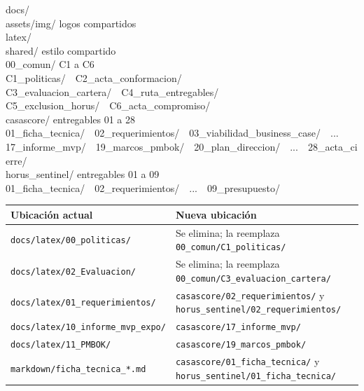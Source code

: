 \documentclass[11pt,a4paper]{article}
\begin{document}
{\small\ttfamily\noindent
docs/\\
\hspace*{1.5em}assets/img/ \hfill \textrm{logos compartidos}\\
\hspace*{1.5em}latex/\\
\hspace*{3em}shared/ \hfill \textrm{estilo compartido}\\
\hspace*{3em}00\_comun/ \hfill \textrm{C1 a C6}\\
\hspace*{4.5em}C1\_politicas/\ \ C2\_acta\_conformacion/\\
\hspace*{4.5em}C3\_evaluacion\_cartera/\ \ C4\_ruta\_entregables/\\
\hspace*{4.5em}C5\_exclusion\_horus/\ \ C6\_acta\_compromiso/\\
\hspace*{3em}casascore/ \hfill \textrm{entregables 01 a 28}\\
\hspace*{4.5em}01\_ficha\_tecnica/\ \ 02\_requerimientos/\ \ 03\_viabilidad\_business\_case/\ \ ...\\
\hspace*{4.5em}17\_informe\_mvp/\ \ 19\_marcos\_pmbok/\ \ 20\_plan\_direccion/\ \ ...\ \ 28\_acta\_cierre/\\
\hspace*{3em}horus\_sentinel/ \hfill \textrm{entregables 01 a 09}\\
\hspace*{4.5em}01\_ficha\_tecnica/\ \ 02\_requerimientos/\ \ ...\ \ 09\_presupuesto/
}
\vspace{0.2cm}


{\small
\noindent\begin{tabularx}{\textwidth}{@{}L L@{}}
\toprule
{}
\textbf{Ubicación actual} & \textbf{Nueva ubicación} \\
\midrule
\texttt{docs/latex/00\_politicas/} & Se elimina; la reemplaza \texttt{00\_comun/C1\_politicas/} \\
\texttt{docs/latex/02\_Evaluacion/} & Se elimina; la reemplaza \texttt{00\_comun/C3\_evaluacion\_cartera/} \\
\texttt{docs/latex/01\_requerimientos/} & \texttt{casascore/02\_requerimientos/} y \texttt{horus\_sentinel/02\_requerimientos/} \\
\texttt{docs/latex/10\_informe\_mvp\_expo/} & \texttt{casascore/17\_informe\_mvp/} \\
\texttt{docs/latex/11\_PMBOK/} & \texttt{casascore/19\_marcos\_pmbok/} \\
\texttt{markdown/ficha\_tecnica\_*.md} & \texttt{casascore/01\_ficha\_tecnica/} y \texttt{horus\_sentinel/01\_ficha\_tecnica/} \\
\bottomrule
\end{tabularx}
}
\end{document}
